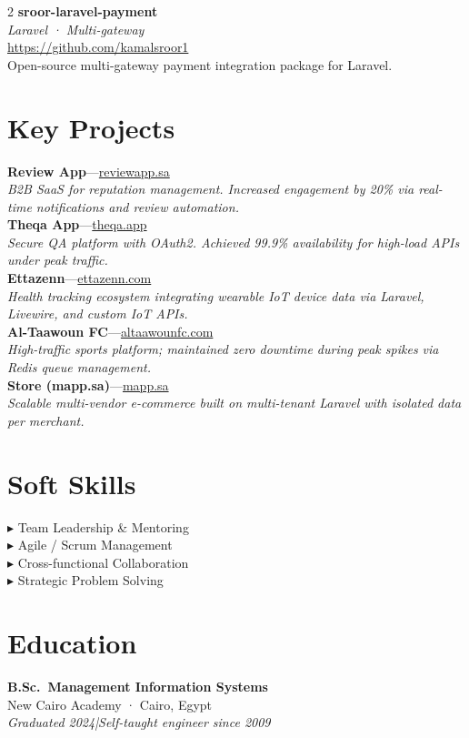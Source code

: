 \documentclass[10pt, a4paper]{article}
\newcommand{\proj}[4]{%
  {\small\bfseries\color{Dark}#1}\enspace---\enspace\href{#3}{\small\color{Blue}#2}\\[1pt]%
  {\footnotesize\color{Light}\textit{#4}}\\[6pt]%
}
\newcommand{\oss}[4]{%
  {\small\bfseries\color{Dark}#1}\\[1pt]%
  {\footnotesize\itshape\color{Light}#2}\\[1pt]%
  \href{#3}{\footnotesize\color{Blue}#3}\\[2pt]%
  {\small\color{Mid}#4}\\[8pt]%
}
\begin{document}
\begin{paracol}{2}
\oss{sroor-laravel-payment}%
    {Laravel · Multi-gateway}%
    {https://github.com/kamalsroor1}%
    {Open-source multi-gateway payment integration package for Laravel.}

\section{Key Projects}

\proj{Review App}{reviewapp.sa}{https://reviewapp.sa/}{B2B SaaS for reputation management. Increased engagement by 20\% via real-time notifications and review automation.}
\proj{Theqa App}{theqa.app}{https://theqa.app/}{Secure QA platform with OAuth2. Achieved 99.9\% availability for high-load APIs under peak traffic.}
\proj{Ettazenn}{ettazenn.com}{https://ettazenn.com/}{Health tracking ecosystem integrating wearable IoT device data via Laravel, Livewire, and custom IoT APIs.}
\proj{Al-Taawoun FC}{altaawounfc.com}{https://altaawounfc.com/}{High-traffic sports platform; maintained zero downtime during peak spikes via Redis queue management.}
\proj{Store (mapp.sa)}{mapp.sa}{https://mapp.sa/}{Scalable multi-vendor e-commerce built on multi-tenant Laravel with isolated data per merchant.}

\section{Soft Skills}

{\small\color{Mid}
▸ Team Leadership \& Mentoring\\[3pt]
▸ Agile / Scrum Management\\[3pt]
▸ Cross-functional Collaboration\\[3pt]
▸ Strategic Problem Solving%
}

\section{Education}

{\small\bfseries\color{Dark}B.Sc.\ Management Information Systems}\\
{\small\color{Mid}New Cairo Academy · Cairo, Egypt}\\
{\small\itshape\color{Light}Graduated 2024\enspace|\enspace Self-taught engineer since 2009}


\end{paracol}
\end{document}
